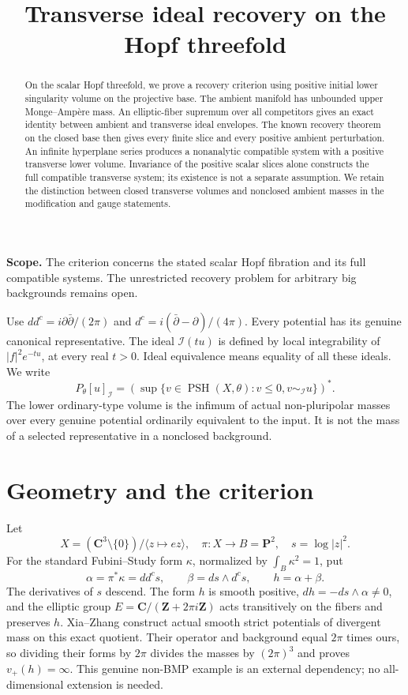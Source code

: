 \documentclass[11pt]{article}
\title{Transverse ideal recovery on the Hopf threefold}
\author{}\date{}
\newcommand{\ddc}{dd^c}
\newcommand{\PSH}{\operatorname{PSH}}
\newcommand{\PI}[2]{P_{#1}[#2]_{\mathcal I}}
\begin{document}
\maketitle
\noindent\textbf{Scope.} The criterion concerns the stated scalar Hopf
fibration and its full compatible systems. The unrestricted recovery
problem for arbitrary big backgrounds remains open.
\begin{abstract}
On the scalar Hopf threefold, we prove a recovery criterion using
positive initial lower singularity volume on the projective base.
The ambient manifold has unbounded upper Monge--Amp\`ere mass.
An elliptic-fiber supremum over all competitors gives an exact identity
between ambient and transverse ideal envelopes. The known recovery
theorem on the closed base then gives every finite slice and every
positive ambient perturbation. An infinite hyperplane series produces
a nonanalytic compatible system with a positive transverse lower
volume. Invariance of the positive scalar slices alone constructs the
full compatible transverse system; its existence is not a separate
assumption. We retain the distinction between closed transverse volumes
and nonclosed ambient masses in the modification and gauge statements.
\end{abstract}

Use $\ddc=i\partial\bar\partial/(2\pi)$ and
$d^c=i(\bar\partial-\partial)/(4\pi)$. Every potential has its genuine
canonical representative. The ideal $\mathcal I(tu)$ is defined by
local integrability of $|f|^2e^{-tu}$, at every real $t>0$.
Ideal equivalence means equality of all these ideals. We write
\[
 \PI{\theta}{u}
 =\left(\sup\{v\in\PSH(X,\theta):v\leq0,
                         v\sim_{\mathcal I}u\}\right)^*.
\]
The lower ordinary-type volume is the infimum of actual non-pluripolar
masses over every genuine potential ordinarily equivalent to the input.
It is not the mass of a selected representative in a nonclosed background.

\section{Geometry and the criterion}
Let
\[
 X=(\mathbf C^3\setminus\{0\})/\langle z\mapsto ez\rangle,
 \quad \pi:X\longrightarrow B=\mathbf P^2,
 \quad s=\log|z|^2.
\]
For the standard Fubini--Study form $\kappa$, normalized by
$\int_B\kappa^2=1$, put
\[
 \alpha=\pi^*\kappa=\ddc s,\qquad
 \beta=ds\wedge d^c s,\qquad h=\alpha+\beta.
\]
The derivatives of $s$ descend. The form $h$ is smooth positive,
$dh=-ds\wedge\alpha\ne0$, and the elliptic group
$E=\mathbf C/(\mathbf Z+2\pi i\mathbf Z)$ acts transitively on the
fibers and preserves $h$. Xia--Zhang \cite[Theorem 1.1]{XZ} construct
actual smooth strict potentials of divergent mass on this exact quotient.
Their operator and background equal $2\pi$ times ours, so dividing
their forms by $2\pi$ divides the masses by $(2\pi)^3$ and proves
$v_+(h)=\infty$. This genuine non-BMP example is an external dependency;
no all-dimensional extension is needed.
\end{document}
